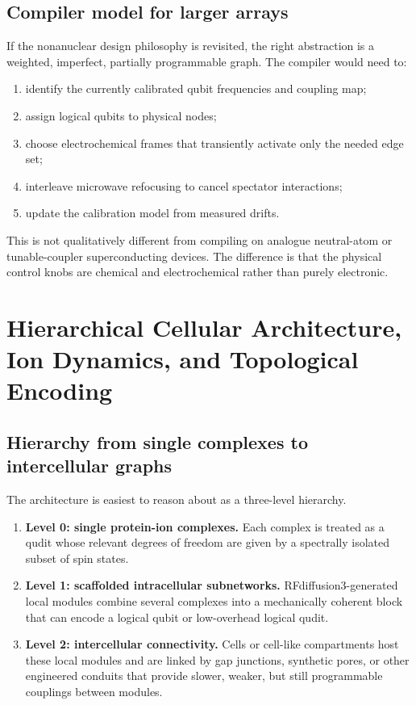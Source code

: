 \documentclass[11pt]{report}
\theoremstyle{definition}
\begin{document}
\section{Compiler model for larger arrays}
If the nonanuclear design philosophy is revisited, the right abstraction is a weighted, imperfect, partially programmable graph. The compiler would need to:

\begin{enumerate}[leftmargin=2em]
\item identify the currently calibrated qubit frequencies and coupling map;
\item assign logical qubits to physical nodes;
\item choose electrochemical frames that transiently activate only the needed edge set;
\item interleave microwave refocusing to cancel spectator interactions;
\item update the calibration model from measured drifts.
\end{enumerate}

This is not qualitatively different from compiling on analogue neutral-atom or tunable-coupler superconducting devices. The difference is that the physical control knobs are chemical and electrochemical rather than purely electronic.

\chapter{Hierarchical Cellular Architecture, Ion Dynamics, and Topological Encoding}

\section{Hierarchy from single complexes to intercellular graphs}
The architecture is easiest to reason about as a three-level hierarchy.

\begin{enumerate}[leftmargin=2em]
\item \textbf{Level 0: single protein-ion complexes.} Each complex is treated as a qudit whose relevant degrees of freedom are given by a spectrally isolated subset of spin states.
\item \textbf{Level 1: scaffolded intracellular subnetworks.} RFdiffusion3-generated local modules combine several complexes into a mechanically coherent block that can encode a logical qubit or low-overhead logical qudit.
\item \textbf{Level 2: intercellular connectivity.} Cells or cell-like compartments host these local modules and are linked by gap junctions, synthetic pores, or other engineered conduits that provide slower, weaker, but still programmable couplings between modules.
\end{enumerate}
\end{document}
